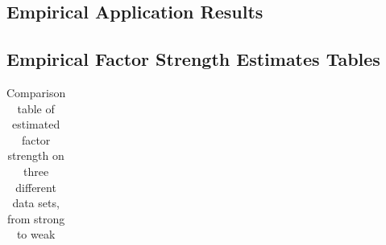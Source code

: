
\addtolength{\jot}{0.1em}
\linespread{1}
\graphicspath{{./plot/}}




\begin{landscape}
			\chapter{Empirical Application Results}
			\section{Empirical Factor Strength Estimates Tables}\label{strength_table}
\begin{footnotesize}
\setlength{\tabcolsep}{2pt}
\singlespacing
\centering



		\begin{longtable}{l|lcc|lcc|lcc}

			
					\caption{Comparison table of estimated factor strength on three different data sets, from strong to weak}\label{table:three_ranked_compare}\\


\end{longtable}
\end{footnotesize}
\end{landscape}
